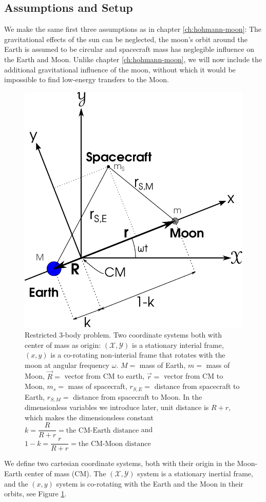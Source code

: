\subsection{Assumptions and Setup}
We make the same first three assumptions as in chapter \ref{ch:hohmann-moon}: The gravitational effects of the sun can be neglected, the moon's orbit around the Earth is assumed to be circular and spacecraft mass has neglegible influence on the Earth and Moon. Unlike chapter \ref{ch:hohmann-moon}, we will now include the additional gravitational influence of the moon, without which it would be impossible to find low-energy transfers to the Moon.

\begin{figure}[h!]
\centering
\includegraphics[scale=0.75]{fig/r3b.pdf}
\caption{Restricted 3-body problem. Two coordinate systems both with center of mass as origin: $(\mathscr{X},\mathscr{Y})$ is a stationary interial frame, $(x,y)$ is a co-rotating non-interial frame that rotates with the moon at angular frequency $\omega$. $M =$ mass of Earth, $m =$ mass of Moon, $\vec{R} =$ vector from CM to earth, $\vec{r} =$ vector from CM to Moon, $m_s =$ mass of spacecraft, $r_{S,E} =$ distance from spacecraft to Earth, $r_{S,M} =$ distance from spacecraft to Moon. In the dimensionless variables we introduce later, unit distance is $R+r$, which makes the dimensionsless constant $k = \dfrac{R}{R+r} = \text{the CM-Earth distance}$ and $1-k = \dfrac{r}{R+r} = \text{the CM-Moon distance}$}
\label{fig:r3b}
\end{figure}
We define two cartesian coordinate systems, both with their origin in the Moon-Earth center of mass (CM). The $(\mathscr{X},\mathscr{Y})$ system is a stationary inertial frame, and the $(x,y)$ system is co-rotating with the Earth and the Moon in their orbits, see Figure \ref{fig:r3b}.

